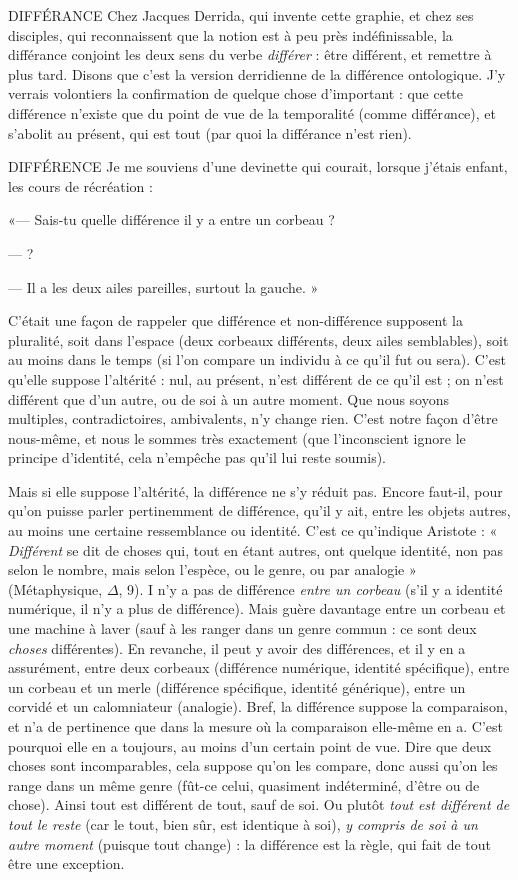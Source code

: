 DIFFÉRANCE Chez Jacques Derrida, qui invente cette graphie, et chez ses
disciples, qui reconnaissent que la notion est à peu près
indéfinissable, la différance conjoint les deux sens du verbe {\it différer} : être différent,
et remettre à plus tard. Disons que c’est la version derridienne de la différence
ontologique. J’y verrais volontiers la confirmation de quelque chose
d’important : que cette différence n’existe que du point de vue de la temporalité
(comme différ{\it a}nce), et s’abolit au présent, qui est tout (par quoi la différance
n’est rien).

DIFFÉRENCE Je me souviens d’une devinette qui courait, lorsque j'étais
enfant, les cours de récréation :

«— Sais-tu quelle différence il y a entre un corbeau ?

— ?

— Il a les deux ailes pareilles, surtout la gauche. »

C'était une façon de rappeler que différence et non-différence supposent la
pluralité, soit dans l’espace (deux corbeaux différents, deux ailes semblables),
soit au moins dans le temps (si l’on compare un individu à ce qu’il fut ou sera).
C’est qu’elle suppose l’altérité : nul, au présent, n’est différent de ce qu’il est ;
on n’est différent que d’un autre, ou de soi à un autre moment. Que nous
soyons multiples, contradictoires, ambivalents, n’y change rien. C’est notre
façon d’être nous-même, et nous le sommes très exactement (que l’inconscient
ignore le principe d’identité, cela n’empêche pas qu’il lui reste soumis).

Mais si elle suppose l’altérité, la différence ne s’y réduit pas. Encore faut-il,
pour qu’on puisse parler pertinemment de différence, qu’il y ait, entre les
objets autres, au moins une certaine ressemblance ou identité. C’est ce
qu’indique Aristote : « {\it Différent} se dit de choses qui, tout en étant autres, ont
quelque identité, non pas selon le nombre, mais selon l’espèce, ou le genre, ou
par analogie » ({\it }Métaphysique, $\Delta$, 9). I n’y a pas de différence {\it entre un corbeau}
(s’il y a identité numérique, il n’y a plus de différence). Mais guère davantage
entre un corbeau et une machine à laver (sauf à les ranger dans un genre
commun : ce sont deux {\it choses} différentes). En revanche, il peut y avoir des différences,
et il y en a assurément, entre deux corbeaux (différence numérique,
identité spécifique), entre un corbeau et un merle (différence spécifique, identité
générique), entre un corvidé et un calomniateur (analogie). Bref, la différence
suppose la comparaison, et n’a de pertinence que dans la mesure où la
comparaison elle-même en a. C’est pourquoi elle en a toujours, au moins d’un
certain point de vue. Dire que deux choses sont incomparables, cela suppose
qu’on les compare, donc aussi qu’on les range dans un même genre (fût-ce
celui, quasiment indéterminé, d’être ou de chose). Ainsi tout est différent de
tout, sauf de soi. Ou plutôt {\it tout est différent de tout le reste} (car le tout, bien sûr,
est identique à soi), {\it y compris de soi à un autre moment} (puisque tout change) :
la différence est la règle, qui fait de tout être une exception.

